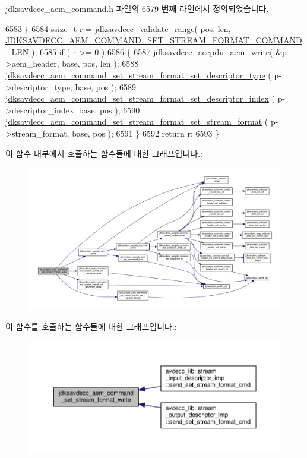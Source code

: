 jdksavdecc\+\_\+aem\+\_\+command.\+h 파일의 6579 번째 라인에서 정의되었습니다.


\begin{DoxyCode}
6583 \{
6584     ssize\_t r = \hyperlink{group__util_ga9c02bdfe76c69163647c3196db7a73a1}{jdksavdecc\_validate\_range}( pos, len, 
      \hyperlink{group__command__set__stream__format_ga54f70043611f17ce7ca3c27c68a02fa6}{JDKSAVDECC\_AEM\_COMMAND\_SET\_STREAM\_FORMAT\_COMMAND\_LEN} );
6585     \textcolor{keywordflow}{if} ( r >= 0 )
6586     \{
6587         \hyperlink{group__aecpdu__aem_gad658e55771cce77cecf7aae91e1dcbc5}{jdksavdecc\_aecpdu\_aem\_write}( &p->aem\_header, base, pos, len );
6588         \hyperlink{group__command__set__stream__format_gae903701f88374d00fc86590fd25c0336}{jdksavdecc\_aem\_command\_set\_stream\_format\_set\_descriptor\_type}
      ( p->descriptor\_type, base, pos );
6589         \hyperlink{group__command__set__stream__format_ga2895d179ad5c426d2d2baef69641a7d6}{jdksavdecc\_aem\_command\_set\_stream\_format\_set\_descriptor\_index}
      ( p->descriptor\_index, base, pos );
6590         \hyperlink{group__command__set__stream__format_ga31d011984248200d22212b36d1bc825d}{jdksavdecc\_aem\_command\_set\_stream\_format\_set\_stream\_format}
      ( p->stream\_format, base, pos );
6591     \}
6592     \textcolor{keywordflow}{return} r;
6593 \}
\end{DoxyCode}


이 함수 내부에서 호출하는 함수들에 대한 그래프입니다.\+:
\nopagebreak
\begin{figure}[H]
\begin{center}
\leavevmode
\includegraphics[width=350pt]{group__command__set__stream__format_ga52683ffa93eb5b180190041f82194ca9_cgraph}
\end{center}
\end{figure}




이 함수를 호출하는 함수들에 대한 그래프입니다.\+:
\nopagebreak
\begin{figure}[H]
\begin{center}
\leavevmode
\includegraphics[width=350pt]{group__command__set__stream__format_ga52683ffa93eb5b180190041f82194ca9_icgraph}
\end{center}
\end{figure}


